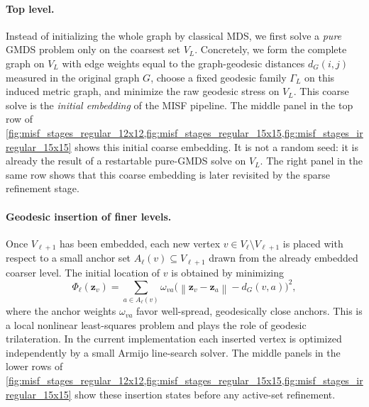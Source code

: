 \documentclass[11pt]{article}
\newcommand{\bz}{\mathbf{z}}
\newcommand{\norm}[1]{\left\|#1\right\|}
\theoremstyle{definition}
\theoremstyle{plain}
\theoremstyle{remark}
\begin{document}
\paragraph{Top level.}
Instead of initializing the whole graph by classical MDS, we first solve a
\emph{pure} GMDS problem only on the coarsest set $V_L$.  Concretely, we form
the complete graph on $V_L$ with edge weights equal to the graph-geodesic
distances $d_G(i,j)$ measured in the original graph $G$, choose a fixed
geodesic family $\Gamma_L$ on this induced metric graph, and minimize the raw
geodesic stress on $V_L$.  This coarse solve is the \emph{initial embedding} of
the MISF pipeline.  The middle panel in the top row of
\cref{fig:misf_stages_regular_12x12,fig:misf_stages_regular_15x15,fig:misf_stages_irregular_15x15}
shows this initial coarse embedding.  It is not a random seed: it is already
the result of a restartable pure-GMDS solve on $V_L$.  The right panel in the
same row shows that this coarse embedding is later revisited by the sparse
refinement stage.

\paragraph{Geodesic insertion of finer levels.}
Once $V_{\ell+1}$ has been embedded, each new vertex $v \in V_\ell \setminus
V_{\ell+1}$ is placed with respect to a small anchor set
$A_\ell(v) \subseteq V_{\ell+1}$ drawn from the already embedded coarser level.
The initial location of $v$ is obtained by minimizing
\[
  \Phi_\ell(\bz_v)
  =
  \sum_{a \in A_\ell(v)}
  \omega_{va}
  \bigl( \norm{\bz_v - \bz_a} - d_G(v,a) \bigr)^2,
\]
where the anchor weights $\omega_{va}$ favor well-spread, geodesically close
anchors.  This is a local nonlinear least-squares problem and plays the role of
geodesic trilateration.  In the current implementation each inserted vertex is
optimized independently by a small Armijo line-search solver.  The middle
panels in the lower rows of
\cref{fig:misf_stages_regular_12x12,fig:misf_stages_regular_15x15,fig:misf_stages_irregular_15x15}
show these insertion states before any active-set refinement.
\end{document}
